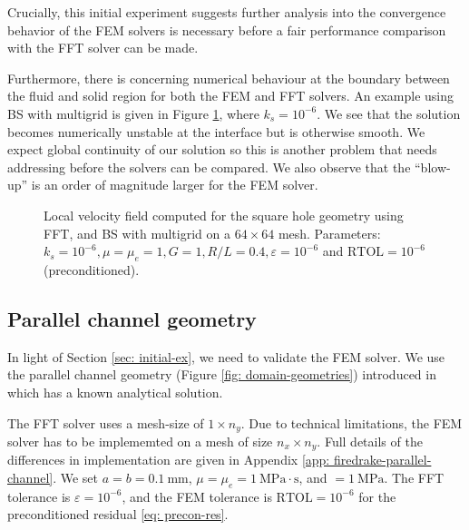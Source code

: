 \documentclass[12pt]{article}
\theoremstyle{theorem}
\begin{document}
Crucially, this initial experiment suggests further analysis into the convergence behavior of the FEM solvers is necessary before a fair performance comparison with the FFT solver can be made.

Furthermore, there is concerning numerical behaviour at the boundary between the fluid and solid region for both the FEM and FFT solvers. An example using BS with multigrid is given in Figure \ref{fig: spiky-main}, where $k_s = 10^{-6}$. We see that the solution becomes numerically unstable at the interface but is otherwise smooth. We expect global continuity of our solution so this is another problem that needs addressing before the solvers can be compared. We also observe that the ``blow-up'' is an order of magnitude larger for the FEM solver. 


\begin{figure}[H]
    \centering
  
    \hfill
    \caption{Local velocity field computed for the square hole geometry using FFT, and BS with multigrid on a $64 \times 64$ mesh. Parameters: $k_s = 10^{-6}, \mu=\mu_e = 1, G=1, R/L = 0.4, \varepsilon = 10^{-6}$ and $\mathrm{RTOL} = 10^{-6}$ (preconditioned).}
    \label{fig: spiky-main} %
\end{figure}

\subsection{Parallel channel geometry}\label{sec: parallel-channel}

In light of Section \ref{sec: initial-ex}, we need to validate the FEM solver. We use the parallel channel geometry (Figure \ref{fig: domain-geometries}) introduced in \cite{chen2023} which has a known analytical solution. 

The FFT solver uses a mesh-size of $1 \times n_y$. Due to technical limitations, the FEM solver has to be implememted on a mesh of size $n_x \times n_y$. Full details of the differences in implementation are given in Appendix \ref{app: firedrake-parallel-channel}. We set $a = b = 0.1~\mathrm{mm}$, $\mu = \mu_e = 1~\mathrm{MPa}\cdot\mathrm{s}$, and $= 1~\mathrm{MPa}.$ The FFT tolerance is $\varepsilon=10^{-6}$, and the FEM tolerance is $\mathrm{RTOL} = 10^{-6}$ for the preconditioned residual \eqref{eq: precon-res}.
\end{document}
